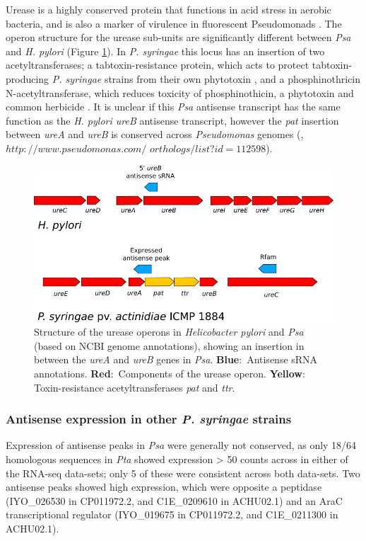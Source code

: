 Urease is a highly conserved protein that functions in acid stress in aerobic bacteria, and is also a marker of virulence in fluorescent Pseudomonads \citep{Bradbury2014-ij}. The operon structure for the urease sub-units are significantly different between \textit{Psa} and \textit{H. pylori} (Figure \ref{fig:ureB_operon}). In \textit{P. syringae} this locus has an insertion of two acetyltransferases; a tabtoxin-resistance protein, which acts to protect tabtoxin-producing \textit{P. syringae} strains from their own phytotoxin \citep{Wencewicz2012-dg}, and a phosphinothricin N-acetyltransferase, which reduces toxicity of phosphinothicin, a phytotoxin and common herbicide \citep{Davies2007-nb}. It is unclear if this \textit{Psa} antisense transcript has the same function as the \textit{H. pylori ureB} antisense transcript, however the \textit{pat} insertion between \textit{ureA} and \textit{ureB} is conserved across \textit{Pseudomonas} genomes (\cite{Davies2007-nb}, $http://www.pseudomonas.com/$
$orthologs/list$?$id=112598$).

\begin{figure}[H]
\centering
        \includegraphics[scale=1.2]{psa/psa_ncRNA/ureb.png}
    \caption[Urease operons in \textit{Helicobacter pylori} and \textit{Psa}]{Structure of the urease operons in \textit{Helicobacter pylori} \citep{De_Reuse1997-mz} and \textit{Psa} (based on NCBI genome annotations), showing an insertion in between the \textit{ureA} and \textit{ureB} genes in \textit{Psa}. \textbf{Blue$:$} Antisense sRNA annotations. \textbf{Red}$:$ Components of the urease operon. \textbf{Yellow$:$} Toxin-resistance acetyltransferases \textit{pat} and \textit{ttr}.}
    \label{fig:ureB_operon}
\end{figure}

\subsubsection{Antisense expression in other \textit{P. syringae} strains}
Expression of antisense peaks in \textit{Psa} were generally not conserved, as only 18/64 homologous sequences in \textit{Pta} showed expression > 50 counts across in either of the RNA-seq data-sets; only 5 of these were consistent across both data-sets. Two antisense peaks showed high expression, which were opposite a peptidase (IYO\_026530 in CP011972.2, and C1E\_0209610 in ACHU02.1) and an AraC transcriptional regulator (IYO\_019675 in CP011972.2, and C1E\_0211300 in ACHU02.1).

